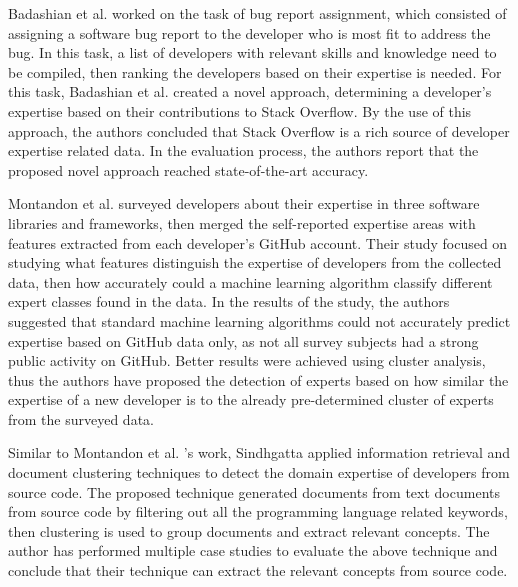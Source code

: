         Badashian et al. \cite{badashian2016crowdsourced} worked on the task of bug report assignment, which consisted of assigning a software bug report to the developer who is most fit to address the bug. In this task, a list of developers with relevant skills and knowledge need to be compiled, then ranking the developers based on their expertise is needed. For this task, Badashian et al. created a novel approach, determining a developer’s expertise based on their contributions to Stack Overflow. By the use of this approach, the authors concluded that Stack Overflow is a rich source of developer expertise related data. In the evaluation process, the authors report that the proposed novel approach reached state-of-the-art accuracy.
        
        Montandon et al. \cite{montandon2019identifying} surveyed developers about their expertise in three software libraries and frameworks, then merged the self-reported expertise areas with features extracted from each developer's GitHub account. Their study focused on studying what features distinguish the expertise of developers from the collected data, then how accurately could a machine learning algorithm classify different expert classes found in the data. In the results of the study, the authors suggested that standard machine learning algorithms could not accurately predict expertise based on GitHub data only, as not all survey subjects had a strong public activity on GitHub. Better results were achieved using cluster analysis, thus the authors have proposed the detection of experts based on how similar the expertise of a new developer is to the already pre-determined cluster of experts from the surveyed data.
        
        Similar to Montandon et al. \cite{montandon2019identifying}'s work, Sindhgatta \cite{sindhgatta2008identifying} applied information retrieval and document clustering techniques to detect the domain expertise of developers from source code. The proposed technique generated documents from text documents from source code by filtering out all the programming language related keywords, then clustering is used to group documents and extract relevant concepts. The author has performed multiple case studies to evaluate the above technique and conclude that their technique can extract the relevant concepts from source code. 
        
